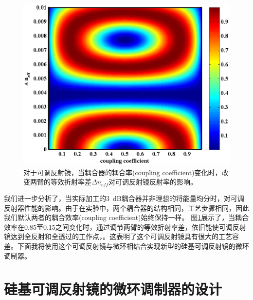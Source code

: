 \begin{figure}[htb]
	\centering
	\includegraphics[width=15cm]{./Pictures/chapt5_grating_ring_real_3dB.eps}
	\caption{对于可调反射镜，当耦合器的耦合率(coupling coefficient)变化时，改变两臂的等效折射率差$\Delta n_{eff}$对可调反射镜反射率的影响。}
	\label{chapt5_grating_ring_real_3dB}
\end{figure}
我们进一步分析了，当实际加工的3~dB耦合器并非理想的将能量均分时，对可调反射器性能的影响。由于在实验中，两个耦合器的结构相同，工艺步骤相同，因此我们默认两者的耦合效率(coupling coefficient)始终保持一样。 图\ref{chapt5_grating_ring_real_3dB}展示了，当耦合效率在0.85至0.15之间变化时，通过调节两臂的等效折射率差，依旧能使可调反射镜达到全反射和全透过的工作点，。这表明了这个可调反射镜具有很大的工艺容差。下面我将使用这个可调反射镜与微环相结合实现新型的硅基可调反射镜的微环调制器。
\section{硅基可调反射镜的微环调制器的设计}